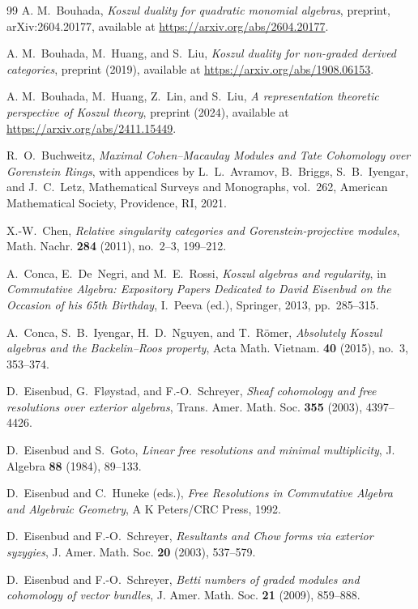 \documentclass[11pt]{article}
\theoremstyle{definition}
\theoremstyle{remark}
\begin{document}
\begin{thebibliography}{99}
A. M.~Bouhada,
\emph{Koszul duality for quadratic monomial algebras},
preprint, arXiv:2604.20177, available at \url{https://arxiv.org/abs/2604.20177}.

A. M.~Bouhada, M.~Huang, and S.~Liu,
\emph{Koszul duality for non-graded derived categories},
preprint (2019), available at \url{https://arxiv.org/abs/1908.06153}.

A. M.~Bouhada, M.~Huang, Z.~Lin, and S.~Liu,
\emph{A representation theoretic perspective of Koszul theory},
preprint (2024), available at \url{https://arxiv.org/abs/2411.15449}.

R.~O.~Buchweitz,
\emph{Maximal Cohen--Macaulay Modules and Tate Cohomology over Gorenstein Rings},
with appendices by L.~L.~Avramov, B.~Briggs, S.~B.~Iyengar, and J.~C.~Letz,
Mathematical Surveys and Monographs, vol.~262,
American Mathematical Society, Providence, RI, 2021.

X.-W.~Chen,
\emph{Relative singularity categories and Gorenstein-projective modules},
Math. Nachr. \textbf{284} (2011), no.~2--3, 199--212.

A.~Conca, E.~De~Negri, and M.~E.~Rossi,
\emph{Koszul algebras and regularity},
in \emph{Commutative Algebra: Expository Papers Dedicated to David Eisenbud on the Occasion of his 65th Birthday},
I.~Peeva (ed.), Springer, 2013, pp.~285--315.

A.~Conca, S.~B.~Iyengar, H.~D.~Nguyen, and T.~R\"omer,
\emph{Absolutely Koszul algebras and the Backelin--Roos property},
Acta Math. Vietnam. \textbf{40} (2015), no.~3, 353--374.

D.~Eisenbud, G.~Fl{\o}ystad, and F.-O.~Schreyer,
\emph{Sheaf cohomology and free resolutions over exterior algebras},
Trans. Amer. Math. Soc. \textbf{355} (2003), 4397--4426.

D.~Eisenbud and S.~Goto,
\emph{Linear free resolutions and minimal multiplicity},
J. Algebra \textbf{88} (1984), 89--133.

D.~Eisenbud and C.~Huneke (eds.),
\emph{Free Resolutions in Commutative Algebra and Algebraic Geometry},
A K Peters/CRC Press, 1992.

D.~Eisenbud and F.-O.~Schreyer,
\emph{Resultants and Chow forms via exterior syzygies},
J. Amer. Math. Soc. \textbf{20} (2003), 537--579.

D.~Eisenbud and F.-O.~Schreyer,
\emph{Betti numbers of graded modules and cohomology of vector bundles},
J. Amer. Math. Soc. \textbf{21} (2009), 859--888.


\end{thebibliography}
\end{document}
